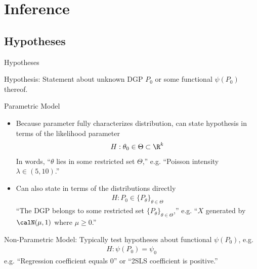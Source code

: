 \documentclass[aspectratio=169, handout]{beamer}
\begin{document}
\section{Inference}

\subsection{Hypotheses}

{\footnotesize
\begin{frame}{Hypotheses}

\alert{Hypothesis}:
Statement about unknown DGP $P_0$ or some functional $\psi(P_0)$
thereof.

\pause
\alert{Parametric Model}
\begin{itemize}
  \item Because parameter fully characterizes distribution,
    can state hypothesis in terms of the likelihood parameter
    \begin{align*}
      H: \theta_0 \in \Theta\subset\R^k
    \end{align*}
    In words, ``$\theta$ lies in some restricted set $\Theta$,''
    e.g. ``Poisson intensity $\lambda\in (5,10)$.''

  \pause
  \item Can also state in terms of the distributions directly
    \begin{align*}
      H:P_0 \in \{P_\theta\}_{\theta \in \Theta}
    \end{align*}
    ``The DGP belongs to some restricted set
    $\{P_\theta\}_{\theta\in\Theta}$,''
    e.g. ``$X$ generated by $\calN(\mu,1)$ where $\mu\geq 0$.''
\end{itemize}

\pause
\alert{Non-Parametric Model}:
Typically test hypotheses about functional $\psi(P_0)$, e.g.
\begin{align*}
  H: \psi(P_0)=\psi_0
\end{align*}
e.g. ``Regression coefficient equals 0'' or ``2SLS coefficient is
positive.''
\end{frame}
}
\end{document}

